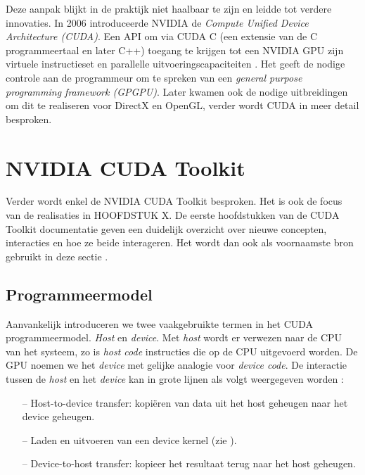 Deze aanpak blijkt in de praktijk niet haalbaar te zijn en leidde tot verdere innovaties. In 2006 introduceerde NVIDIA de \textit{Compute Unified Device Architecture (CUDA)}. Een API om via CUDA C (een extensie van de C programmeertaal en later C++) toegang te krijgen tot een NVIDIA GPU zijn virtuele instructieset en parallelle uitvoeringscapaciteiten \cite{NVIDIADOC2021}\cite{Adve2012}. Het geeft de nodige controle aan de programmeur om te spreken van een \textit{general purpose programming framework (GPGPU)}. Later kwamen ook de nodige uitbreidingen om dit te realiseren voor DirectX en OpenGL, verder wordt CUDA in meer detail besproken.

\section{NVIDIA CUDA Toolkit}
\label{sec:nv_cuda_toolkit}

Verder wordt enkel de NVIDIA CUDA Toolkit besproken. Het is ook de focus van de realisaties in HOOFDSTUK X. De eerste hoofdstukken van de CUDA Toolkit documentatie geven een duidelijk overzicht over nieuwe concepten, interacties en hoe ze beide interageren. Het wordt dan ook als voornaamste bron gebruikt in deze sectie \cite{NVIDIADOC2021}.


\subsection{Programmeermodel}

Aanvankelijk introduceren we twee vaakgebruikte termen in het CUDA programmeermodel. \textit{Host} en \textit{device}. Met \textit{host} wordt er verwezen naar de CPU van het systeem, zo is \textit{host code} instructies die op de CPU uitgevoerd worden. De GPU noemen we het \textit{device} met gelijke analogie voor \textit{device code}. De interactie tussen de \textit{host} en het \textit{device} kan in grote lijnen als volgt weergegeven worden \cite{Gupta2020}:

\begin{itemize}
	\item[--] Host-to-device transfer: kopiëren van data uit het host geheugen naar het device geheugen.
	\item[--] Laden en uitvoeren van een device kernel (zie ).
	\item[--] Device-to-host transfer: kopieer het resultaat terug naar het host geheugen.
\end{itemize}

